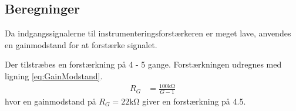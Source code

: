 \subsection{Beregninger}
Da indgangssignalerne til instrumenteringsforstærkeren er meget lave, anvendes en gainmodstand for at forstærke signalet.

Der tilstræbes en forstærkning på 4 - 5 gange. Forstærkningen udregnes med ligning \ref{eq:GainModstand}.
\begin{align}
	R_G & = \frac{100 \si{\kilo\ohm}}{G-1} \label{eq:GainModstand}
\end{align}
hvor en gainmodstand på $R_G = 22 \si{\kilo\ohm}$ giver en forstærkning på 4.5.